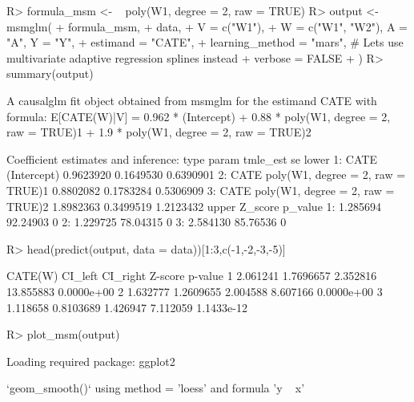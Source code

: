 \documentclass[
]{jss}
\begin{document}
\begin{CodeChunk}
\begin{CodeInput}
R> formula_msm <- ~ poly(W1, degree = 2, raw = TRUE)  
R> output <- msmglm(
+       formula_msm, 
+       data,
+       V = c("W1"),
+       W = c("W1", "W2"), A = "A", Y = "Y",
+       estimand = "CATE", 
+       learning_method = "mars", # Lets use multivariate adaptive regression splines instead
+       verbose = FALSE
+       )
R> summary(output)
\end{CodeInput}
\begin{CodeOutput}
A causalglm fit object obtained from msmglm for the estimand CATE with formula: 
E[CATE(W)|V] = 0.962 * (Intercept) + 0.88 * poly(W1, degree = 2, raw = TRUE)1 + 1.9 * poly(W1, degree = 2, raw = TRUE)2

Coefficient estimates and inference:
   type                             param  tmle_est        se     lower
1: CATE                       (Intercept) 0.9623920 0.1649530 0.6390901
2: CATE poly(W1, degree = 2, raw = TRUE)1 0.8802082 0.1783284 0.5306909
3: CATE poly(W1, degree = 2, raw = TRUE)2 1.8982363 0.3499519 1.2123432
      upper  Z_score p_value
1: 1.285694 92.24903       0
2: 1.229725 78.04315       0
3: 2.584130 85.76536       0
\end{CodeOutput}
\begin{CodeInput}
R> head(predict(output, data = data))[1:3,c(-1,-2,-3,-5)]
\end{CodeInput}
\begin{CodeOutput}
   CATE(W)   CI_left CI_right   Z-score    p-value
1 2.061241 1.7696657 2.352816 13.855883 0.0000e+00
2 1.632777 1.2609655 2.004588  8.607166 0.0000e+00
3 1.118658 0.8103689 1.426947  7.112059 1.1433e-12
\end{CodeOutput}
\begin{CodeInput}
R> plot_msm(output)
\end{CodeInput}
\begin{CodeOutput}
Loading required package: ggplot2
\end{CodeOutput}
\begin{CodeOutput}
`geom_smooth()` using method = 'loess' and formula 'y ~ x'
\end{CodeOutput}



\end{CodeChunk}
\end{document}
